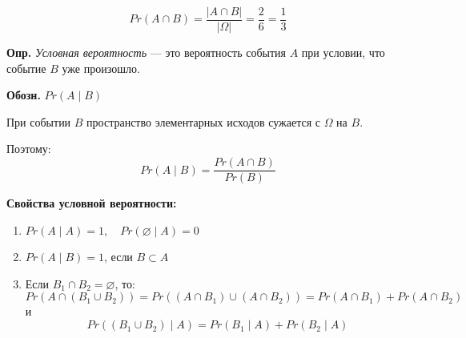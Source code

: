 \documentclass[10pt, a4paper]{article}
\begin{document}
\[
Pr(A \cap B) = \frac{|A \cap B|}{|\Omega|} = \frac{2}{6} = \frac{1}{3}
\]

\noindent
\textbf{Опр.} \textit{Условная вероятность} — это вероятность события $A$ при условии, что событие $B$ уже произошло.

\noindent
\textbf{Обозн.} $Pr(A \mid B)$

\vspace{0.3em}
\noindent
При событии $B$ пространство элементарных исходов сужается с $\Omega$ на $B$.

\noindent
Поэтому:
\[
Pr(A \mid B) = \frac{Pr(A \cap B)}{Pr(B)}
\]
\noindent
\begin{center}
\end{center}

\vspace{1.5em}

\noindent
\textbf{Свойства условной вероятности:}
\begin{enumerate}
    \item $Pr(A \mid A) = 1, \quad Pr(\varnothing \mid A) = 0$
    \item $Pr(A \mid B) = 1$, \quad если $B \subset A$
    \item Если $B_1 \cap B_2 = \varnothing$, то:
    \[
    Pr(A \cap (B_1 \cup B_2)) = Pr((A \cap B_1) \cup (A \cap B_2)) = Pr(A \cap B_1) + Pr(A \cap B_2)
    \]
    и
    \[
    Pr((B_1 \cup B_2) \mid A) = Pr(B_1 \mid A) + Pr(B_2 \mid A)
    \]
\end{enumerate}
\end{document}
